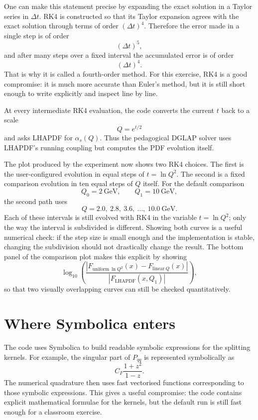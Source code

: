\documentclass[11pt]{article}
\newcommand{\as}{\alpha_s}
\newcommand{\gev}{\mathrm{GeV}}
\begin{document}
One can make this statement precise by expanding the exact solution in a Taylor
series in \(\Delta t\).  RK4 is constructed so that its Taylor expansion agrees
with the exact solution through terms of order \((\Delta t)^4\).  Therefore the
error made in a single step is of order
\[
  (\Delta t)^5,
\]
and after many steps over a fixed interval the accumulated error is of order
\[
  (\Delta t)^4.
\]
That is why it is called a fourth-order method.  For this exercise, RK4 is a
good compromise: it is much more accurate than Euler's method, but it is still
short enough to write explicitly and inspect line by line.

At every intermediate RK4 evaluation, the code converts the current \(t\) back
to a scale
\[
  Q = e^{t/2}
\]
and asks LHAPDF for \(\as(Q)\).  Thus the pedagogical DGLAP solver uses
LHAPDF's running coupling but computes the PDF evolution itself.

The plot produced by the experiment now shows two RK4 choices.  The first is
the user-configured evolution in equal steps of \(t=\ln Q^2\).  The second is a
fixed comparison evolution in ten equal steps of \(Q\) itself.  For the default
comparison
\[
  Q_0=2~\gev,\qquad Q_1=10~\gev,
\]
the second path uses
\[
  Q = 2.0,\ 2.8,\ 3.6,\ \ldots,\ 10.0~\gev.
\]
Each of these intervals is still evolved with RK4 in the variable
\(t=\ln Q^2\); only the way the interval is subdivided is different.  Showing
both curves is a useful numerical check: if the step size is small enough and
the implementation is stable, changing the subdivision should not drastically
change the result.
The bottom panel of the comparison plot makes this explicit by showing
\[
  \log_{10}
  \left(
    \frac{|F_{\mathrm{uniform}\ \ln Q^2}(x)-F_{\mathrm{linear}\ Q}(x)|}
         {|F_{\mathrm{LHAPDF}}(x,Q_1)|}
  \right),
\]
so that two visually overlapping curves can still be checked quantitatively.

\section{Where Symbolica enters}

The code uses Symbolica to build readable symbolic expressions for the
splitting kernels.  For example, the singular part of \(P_{qq}\) is represented
symbolically as
\[
  C_F\frac{1+z^2}{1-z}.
\]
The numerical quadrature then uses fast vectorised functions corresponding to
those symbolic expressions.  This gives a useful compromise: the code contains
explicit mathematical formulae for the kernels, but the default run is still
fast enough for a classroom exercise.
\end{document}
